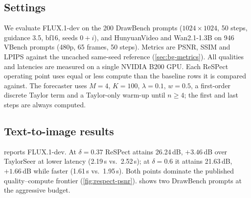 \subsection{Settings}
We evaluate FLUX.1-dev on the 200 DrawBench prompts ($1024\times1024$, 50 steps, guidance 3.5, bf16, seeds $0+i$), and HunyuanVideo and Wan2.1-1.3B on 946 VBench prompts (480p, 65 frames, 50 steps). Metrics are PSNR, SSIM and LPIPS against the uncached same-seed reference (\cref{sec:bg-metrics}). All qualities and latencies are measured on a single NVIDIA B200 GPU. Each ReSPect operating point uses equal or less compute than the baseline rows it is compared against. The forecaster uses $M=4$, $K=100$, $\lambda=0.1$, $w=0.5$, a first-order discrete Taylor term and a Taylor-only warm-up until $n\ge4$; the first and last steps are always computed.

\subsection{Text-to-image results}
 reports FLUX.1-dev. At $\delta=0.37$ ReSPect attains 26.24\,dB, $+3.46$\,dB over TaylorSeer at lower latency (2.19\,s vs.\ 2.52\,s); at $\delta=0.6$ it attains 21.63\,dB, $+1.66$\,dB while faster (1.61\,s vs.\ 1.95\,s). Both points dominate the published quality--compute frontier (\cref{fig:respect-psnr}).  shows two DrawBench prompts at the aggressive budget.

